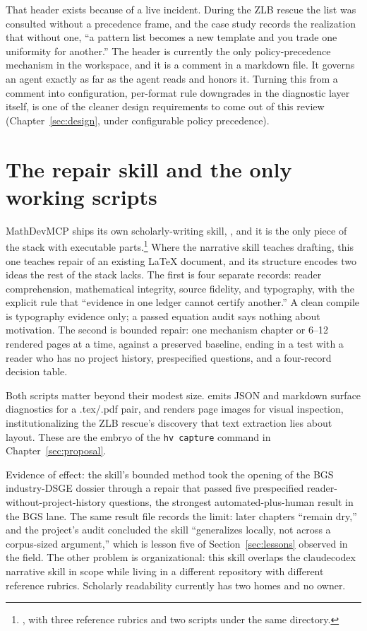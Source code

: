 That header exists because of a live incident. During the ZLB rescue the
list was consulted without a precedence frame, and the case study records
the realization that without one, ``a pattern list becomes a new template and
you trade one uniformity for another.'' The header is currently the only
policy-precedence mechanism in the workspace, and it is a comment in a
markdown file. It governs an agent exactly as far as the agent reads and
honors it. Turning this from a comment into configuration, per-format rule
downgrades in the diagnostic layer itself, is one of the cleaner design
requirements to come out of this review
(Chapter~\ref{sec:design}, under configurable policy precedence).

\section{The repair skill and the only working scripts}
\label{sec:tool-repair}

MathDevMCP ships its own scholarly-writing skill,
, and it is the only piece of the stack
with executable parts.\footnote{, with three reference rubrics and two scripts under the same directory.}
Where the narrative skill teaches drafting, this one teaches repair of an
existing LaTeX document, and its structure encodes two ideas the rest of the
stack lacks. The first is four separate records: reader comprehension,
mathematical integrity, source fidelity, and typography, with the explicit
rule that ``evidence in one ledger cannot certify another.'' A clean compile
is typography evidence only; a passed equation audit says nothing about
motivation. The second is bounded repair: one mechanism chapter or 6--12
rendered pages at a time, against a preserved baseline, ending in a test with a
reader who has no project history, prespecified questions, and a four-record
decision table.

Both scripts matter beyond their modest size.
 emits JSON and markdown surface
diagnostics for a .tex/.pdf pair, and 
renders page images for visual inspection, institutionalizing the ZLB
rescue's discovery that text extraction lies about layout. These are the
embryo of the \texttt{hv capture} command in Chapter~\ref{sec:proposal}.

Evidence of effect: the skill's bounded method took the opening of the BGS
industry-DSGE dossier through a repair that passed five prespecified
reader-without-project-history questions, the strongest automated-plus-human result in the BGS
lane. The same result file records the limit: later chapters ``remain dry,''
and the project's audit concluded the skill ``generalizes locally, not across
a corpus-sized argument,'' which is lesson five of
Section~\ref{sec:lessons} observed in the field. The other problem is
organizational: this skill overlaps the claudecodex narrative skill in scope
while living in a different repository with different reference rubrics.
Scholarly readability currently has two homes and no owner.

